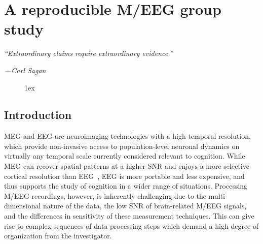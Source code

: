 \chapter{A reproducible M/EEG group study}

\vspace{20pt}
\epigraph{\small\itshape ``Extraordinary claims require extraordinary evidence.''}
{\small\textit{---Carl Sagan}}

\begin{figure}[ht!]
\centering
\begingroup
\etocstandardlines
\renewcommand{\etocbelowtocskip}{0pt\relax}
\fboxsep1ex
\localtableofcontents
\endgroup
\end{figure}

\clearpage
\section{Introduction}
\label{sec:group_study_intro}

\Ac{MEG} and \ac{EEG} are neuroimaging technologies with a high temporal resolution, which provide non-invasive access to population-level neuronal dynamics on virtually any temporal scale currently considered relevant to cognition. %
While MEG can recover spatial patterns at a higher \ac{SNR} and enjoys a more selective cortical resolution than \ac{EEG}~\citep{baillet17}, EEG is more portable and less expensive, and thus supports the study of cognition in a wider range of situations. Processing M/EEG recordings, however, is inherently challenging due to the multi-dimensional nature of the data, the low \ac{SNR} of brain-related M/EEG signals, and the differences in sensitivity of these measurement techniques. This can give rise to complex sequences of data processing steps which demand a high degree of organization from the investigator.

